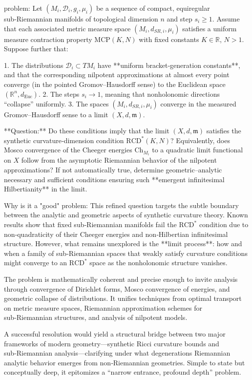 problem:  
Let \((M_i,\mathcal{D}_i,g_i,\mu_i)\) be a sequence of compact, equiregular sub‑Riemannian manifolds of topological dimension \(n\) and step \(s_i\ge 1\).  
Assume that each associated metric measure space \((M_i,d_{SR,i},\mu_i)\) satisfies a uniform measure contraction property \(\mathrm{MCP}(K,N)\) with fixed constants \(K\in\mathbb{R}\), \(N>1\).  
Suppose further that:  

1. The distributions \(\mathcal{D}_i\subset TM_i\) have **uniform bracket‑generation constants**, and that the corresponding nilpotent approximations at almost every point converge (in the pointed Gromov–Hausdorff sense) to the Euclidean space \((\mathbb{R}^n, d_{\mathrm{Euc}})\).  
2. The steps \(s_i\to 1\), meaning that nonholonomic directions “collapse” uniformly.  
3. The spaces \((M_i,d_{SR,i},\mu_i)\) converge in the measured Gromov–Hausdorff sense to a limit \((X,d,\mathfrak{m})\).  

**Question:**  
Do these conditions imply that the limit \((X,d,\mathfrak{m})\) satisfies the synthetic curvature‑dimension condition \(\mathrm{RCD}^*(K,N)\)?  
Equivalently, does Mosco convergence of the Cheeger energies \(\mathrm{Ch}_{M_i}\) to a quadratic limit functional on \(X\) follow from the asymptotic Riemannian behavior of the nilpotent approximations?   
If not automatically true, determine geometric–analytic necessary and sufficient conditions ensuring such **emergent infinitesimal Hilbertianity** in the limit.  

Why is it a "good" problem:  
This refined question targets the subtle boundary between the analytic and geometric aspects of synthetic curvature theory. Known results show that fixed sub‑Riemannian manifolds fail the \(\mathrm{RCD}^*\) condition due to non‑quadraticity of their Cheeger energies and non‑Hilbertian infinitesimal structure. However, what remains unexplored is the **limit process**: how and when a family of sub‑Riemannian spaces that weakly satisfy curvature conditions might converge to an \(\mathrm{RCD}^*\) space as the nonholonomic structure vanishes.  

The problem is mathematically coherent and precise enough to invite analysis through convergence of Dirichlet forms, Mosco convergence of energies, and geometric collapse of distributions. It unifies techniques from optimal transport on metric measure spaces, Riemannian approximation schemes for sub‑Riemannian structures, and analysis of nilpotent models.  

A successful resolution would yield a structural bridge between two major frameworks of modern geometry—synthetic Ricci curvature bounds and sub‑Riemannian analysis—clarifying under what degenerations Riemannian analytic behavior emerges from non‑Riemannian geometries. Simple to state but conceptually deep, it epitomizes a “narrow entrance, profound depth” problem.